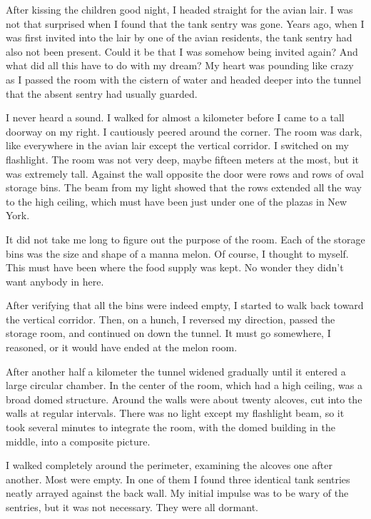 \documentclass[]{article}
\begin{document}
After kissing the children good night, I headed straight for the avian lair.  I was not that surprised when I found that the tank sentry was gone.  Years ago, when I was first invited into the lair by one of the avian residents, the tank sentry had also not been present.  Could it be that I was somehow being invited again? And what did all this have to do with my dream? My heart was pounding like crazy as I passed the room with the cistern of water and headed deeper into the tunnel that the absent sentry had usually guarded.

I never heard a sound.  I walked for almost a kilometer before I came to a tall doorway on my right.  I cautiously peered around the corner.  The room was dark, like everywhere in the avian lair except the vertical corridor.  I switched on my flashlight.  The room was not very deep, maybe fifteen meters at the most, but it was extremely tall.  Against the wall opposite the door were rows and rows of oval storage bins.  The beam from my light showed that the rows extended all the way to the high ceiling, which must have been just under one of the plazas in New York.

It did not take me long to figure out the purpose of the room.  Each of the storage bins was the size and shape of a manna melon.  Of course, I thought to myself.  This must have been where the food supply was kept.  No wonder they didn’t want anybody in here.

After verifying that all the bins were indeed empty, I started to walk back toward the vertical corridor.  Then, on a hunch, I reversed my direction, passed the storage room, and continued on down the tunnel.  It must go somewhere, I reasoned, or it would have ended at the melon room.

After another half a kilometer the tunnel widened gradually until it entered a large circular chamber.  In the center of the room, which had a high ceiling, was a broad domed structure.  Around the walls were about twenty alcoves, cut into the walls at regular intervals.  There was no light except my flashlight beam, so it took several minutes to integrate the room, with the domed building in the middle, into a composite picture.

I walked completely around the perimeter, examining the alcoves one after another.  Most were empty.  In one of them I found three identical tank sentries neatly arrayed against the back wall.  My initial impulse was to be wary of the sentries, but it was not necessary.  They were all dormant.
\end{document}
